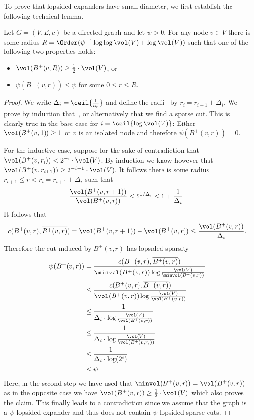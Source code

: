 To prove that lopsided expanders have small diameter, we first establish the following technical lemma. 

\begin{lemma} \label{lem:lopsided-expansion}
Let $G = (V, E, c)$ be a directed graph and let $\psi > 0$. For any node $v \in V$ there is some radius $R = \Order(\psi^{-1} \log\log \vol(V) + \log \vol(V))$ such that one of the following two properties holds:
\begin{itemize}
	\item $\vol(B^+(v, R)) \geq \frac{1}{2} \cdot \vol(V)$, or
	\item $\psi(B^+(v, r)) \leq \psi$ for some $0 \leq r \leq R$.
\end{itemize}
\end{lemma}
\begin{proof}
We write $\Delta_i = \ceil{\frac{1}{i \psi}}$ and define the radii~ by $r_i = r_{i+1} + \Delta_i$. We prove by induction that~, or alternatively that we find a sparse cut. This is clearly true in the base case for $i = \ceil{\log \vol(V)}$: Either $\vol(B^+(v, 1)) \geq 1$ or $v$ is an isolated node and therefore $\psi(B^+(v, r)) = 0$.

For the inductive case, suppose for the sake of contradiction that $\vol(B^+(v, r_i)) < 2^{-i} \cdot \vol(V)$. By induction we know however that $\vol(B^+(v, r_{i+1})) \geq 2^{-i-1} \cdot \vol(V)$. It follows there is some radius $r_{i+1} \leq r < r_i = r_{i+1} + \Delta_i$ such that
\begin{equation*}
	\frac{\vol(B^+(v, r + 1))}{\vol(B^+(v, r))} \leq 2^{1/\Delta_i} \leq 1 + \frac{1}{\Delta_i}.
\end{equation*}
It follows that
\begin{equation*}
	c(B^+(v, r), \overline{B^+(v, r)}) = \vol(B^+(v, r + 1)) - \vol(B^+(v, r)) \leq \frac{\vol(B^+(v, r))}{\Delta_i}.
\end{equation*}
Therefore the cut induced by $B^+(v, r)$ has lopsided sparsity
\begin{align*}
	\psi(B^+(v, r)) &= \frac{c(B^+(v, r), \overline{B^+(v, r)})}{\minvol(B^+(v, r)) \log \frac{\vol(V)}{\minvol(B^+(v, r))}} \\
	&\leq \frac{c(B^+(v, r), \overline{B^+(v, r)})}{\vol(B^+(v, r)) \log \frac{\vol(V)}{\vol(B^+(v, r))}} \\
	&\leq \frac{1}{\Delta_i \cdot \log \frac{\vol(V)}{\vol(B^+(v, r))}} \\
	&\leq \frac{1}{\Delta_i \cdot \log \frac{\vol(V)}{\vol(B^+(v, r_i))}} \\
	&\leq \frac{1}{\Delta_i \cdot \log(2^i)} \\
	&\leq \psi.
\end{align*}
Here, in the second step we have used that $\minvol(B^+(v, r)) = \vol(B^+(v, r))$ as in the opposite case we have $\vol(B^+(v, r)) \geq \frac{1}{2} \cdot \vol(V)$ which also proves the claim. This finally leads to a contradiction since we assume that the graph is a $\psi$-lopsided expander and thus does not contain $\psi$-lopsided sparse cuts.


\end{proof}
